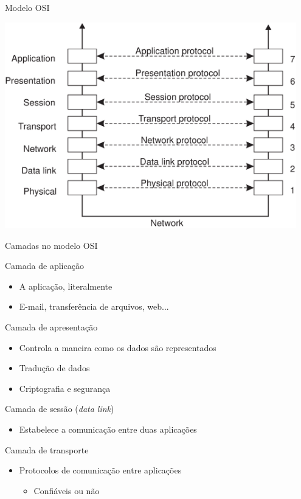 \documentclass[compress]{beamer}
\begin{document}

\begin{frame}{Modelo OSI}

\vspace{0.3cm}

\centering \includegraphics[width=0.95\textwidth]{images/osi.png}

\end{frame}


\begin{frame}{Camadas no modelo OSI}

Camada de aplicação
\begin{itemize}
    \item A aplicação, literalmente
    \item E-mail, transferência de arquivos,  web...
\end{itemize}

Camada de apresentação
\begin{itemize}
    \item Controla a maneira como os dados são representados
    \item Tradução de dados
    \item Criptografia e segurança
\end{itemize}

Camada de sessão (\textit{data link})
\begin{itemize}
    \item Estabelece a comunicação entre duas aplicações
\end{itemize}

Camada de transporte
\begin{itemize}
    \item Protocolos de comunicação entre aplicações
    \begin{itemize}
        \item Confiáveis ou não
    \end{itemize}
\end{itemize}

\end{frame}
\end{document}
